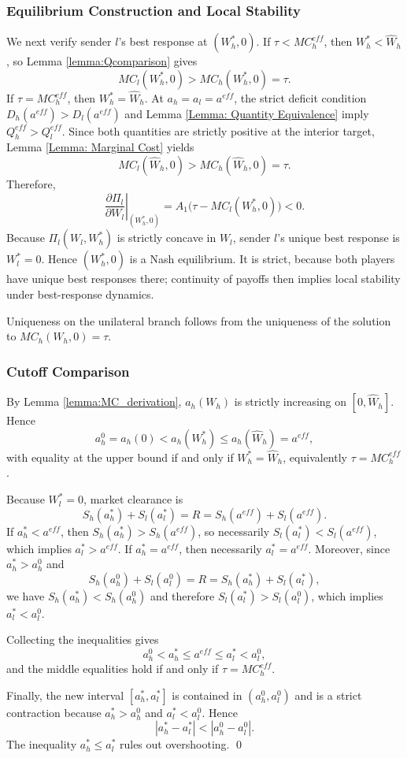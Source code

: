 \documentclass[12pt, a4paper]{article}
\begin{document}
\subsubsection*{Equilibrium Construction and Local Stability}
We next verify sender $l$'s best response at $(W_h^*,0)$. If $\tau<MC_h^{eff}$, then $W_h^*<\hat W_h$, so Lemma \ref{lemma:Qcomparison} gives
\[
MC_l(W_h^*,0)>MC_h(W_h^*,0)=\tau.
\]
If $\tau=MC_h^{eff}$, then $W_h^*=\hat W_h$. At $a_h=a_l=a^{eff}$, the strict deficit condition $D_h(a^{eff})>D_l(a^{eff})$ and Lemma \ref{Lemma: Quantity Equivalence} imply $Q_h^{eff}>Q_l^{eff}$. Since both quantities are strictly positive at the interior target, Lemma \ref{Lemma: Marginal Cost} yields
\[
MC_l(\hat W_h,0)>MC_h(\hat W_h,0)=\tau.
\]
Therefore,
\[
\left.\frac{\partial \Pi_l}{\partial W_l}\right|_{(W_h^*,0)}
=A_1\big(\tau-MC_l(W_h^*,0)\big)<0.
\]
Because $\Pi_l(W_l,W_h^*)$ is strictly concave in $W_l$, sender $l$'s unique best response is $W_l^*=0$. Hence $(W_h^*,0)$ is a Nash equilibrium. It is strict, because both players have unique best responses there; continuity of payoffs then implies local stability under best-response dynamics.

Uniqueness on the unilateral branch follows from the uniqueness of the solution to $MC_h(W_h,0)=\tau$.

\subsubsection*{Cutoff Comparison}
By Lemma \ref{lemma:MC_derivation}, $a_h(W_h)$ is strictly increasing on $[0,\hat W_h]$. Hence
\[
a_h^0=a_h(0)<a_h(W_h^*)\le a_h(\hat W_h)=a^{eff},
\]
with equality at the upper bound if and only if $W_h^*=\hat W_h$, equivalently $\tau=MC_h^{eff}$.

Because $W_l^*=0$, market clearance is
\[
S_h(a_h^*)+S_l(a_l^*)=R=S_h(a^{eff})+S_l(a^{eff}).
\]
If $a_h^*<a^{eff}$, then $S_h(a_h^*)>S_h(a^{eff})$, so necessarily $S_l(a_l^*)<S_l(a^{eff})$, which implies $a_l^*>a^{eff}$. If $a_h^*=a^{eff}$, then necessarily $a_l^*=a^{eff}$. Moreover, since $a_h^*>a_h^0$ and
\[
S_h(a_h^0)+S_l(a_l^0)=R=S_h(a_h^*)+S_l(a_l^*),
\]
we have $S_h(a_h^*)<S_h(a_h^0)$ and therefore $S_l(a_l^*)>S_l(a_l^0)$, which implies $a_l^*<a_l^0$.

Collecting the inequalities gives
\[
a_h^0<a_h^*\le a^{eff}\le a_l^*<a_l^0,
\]
and the middle equalities hold if and only if $\tau=MC_h^{eff}$.

Finally, the new interval $[a_h^*,a_l^*]$ is contained in $(a_h^0,a_l^0)$ and is a strict contraction because $a_h^*>a_h^0$ and $a_l^*<a_l^0$. Hence
\[
|a_h^*-a_l^*|<|a_h^0-a_l^0|.
\]
The inequality $a_h^*\le a_l^*$ rules out overshooting. \qed
\end{document}
